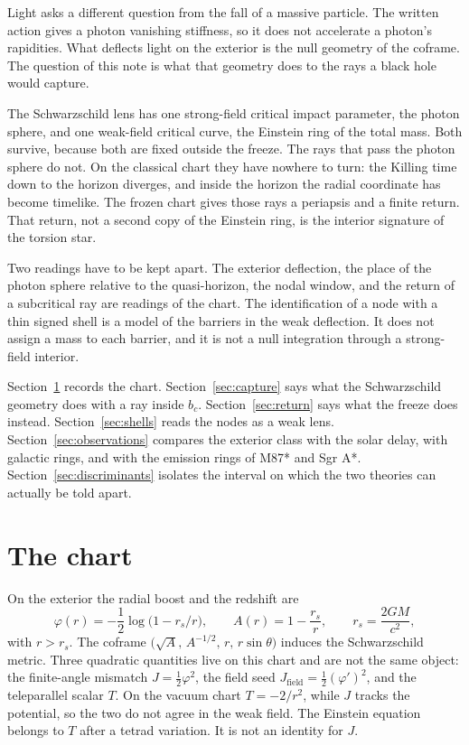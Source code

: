 \documentclass[a4paper]{article}
\begin{document}
Light asks a different question from the fall of a massive particle. The written action gives a photon vanishing stiffness, so it does not accelerate a photon's rapidities. What deflects light on the exterior is the null geometry of the coframe. The question of this note is what that geometry does to the rays a black hole would capture.

The Schwarzschild lens has one strong-field critical impact parameter, the photon sphere, and one weak-field critical curve, the Einstein ring of the total mass. Both survive, because both are fixed outside the freeze. The rays that pass the photon sphere do not. On the classical chart they have nowhere to turn: the Killing time down to the horizon diverges, and inside the horizon the radial coordinate has become timelike. The frozen chart gives those rays a periapsis and a finite return. That return, not a second copy of the Einstein ring, is the interior signature of the torsion star.

Two readings have to be kept apart. The exterior deflection, the place of the photon sphere relative to the quasi-horizon, the nodal window, and the return of a subcritical ray are readings of the chart. The identification of a node with a thin signed shell is a model of the barriers in the weak deflection. It does not assign a mass to each barrier, and it is not a null integration through a strong-field interior.

Section~\ref{sec:chart} records the chart. Section~\ref{sec:capture} says what the Schwarzschild geometry does with a ray inside \(b_c\). Section~\ref{sec:return} says what the freeze does instead. Section~\ref{sec:shells} reads the nodes as a weak lens. Section~\ref{sec:observations} compares the exterior class with the solar delay, with galactic rings, and with the emission rings of M87* and Sgr A*. Section~\ref{sec:discriminants} isolates the interval on which the two theories can actually be told apart.

\section{The chart}
\label{sec:chart}

On the exterior the radial boost and the redshift are
\begin{equation}
\label{eq:exterior-A}
\varphi(r)=-\frac12\log\bigl(1-r_s/r\bigr),
\qquad
A(r)=1-\frac{r_s}{r},
\qquad
r_s=\frac{2GM}{c^2},
\end{equation}
with \(r>r_s\). The coframe \(\bigl(\sqrt{A},\,A^{-1/2},\,r,\,r\sin\theta\bigr)\) induces the Schwarzschild metric. Three quadratic quantities live on this chart and are not the same object: the finite-angle mismatch \(J=\frac12\varphi^2\), the field seed \(J_{\mathrm{field}}=\frac12(\varphi')^2\), and the teleparallel scalar \(T\). On the vacuum chart \(T=-2/r^2\), while \(J\) tracks the potential, so the two do not agree in the weak field. The Einstein equation belongs to \(T\) after a tetrad variation. It is not an identity for \(J\).
\end{document}
